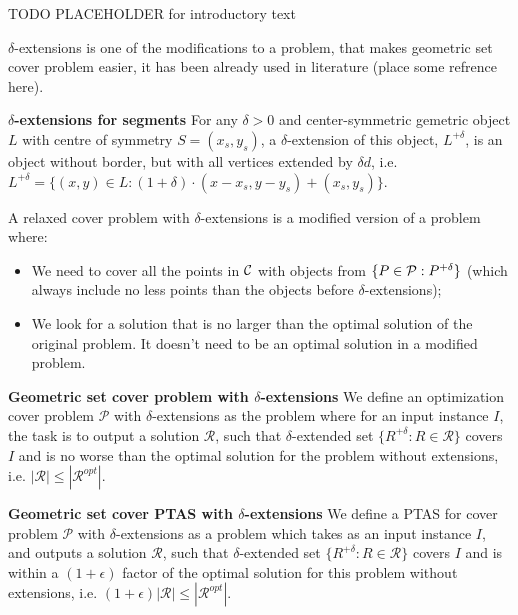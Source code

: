 TODO PLACEHOLDER for introductory text

$\delta$-extensions is one of the
modifications to a problem, that makes geometric set cover problem easier,
it has been already used in literature (place some refrence here).

\begin{defi}\textbf{$\delta$-extensions for segments}
For any $\delta > 0$ and center-symmetric gemetric object $L$ with
centre of symmetry $S = (x_s, y_s)$,
a $\delta$-extension of this object, $L^{+\delta}$,
is an object without border, but with all vertices extended by $\delta d$,
i.e. $ L^{+\delta} =
\{ (x, y) \in L : (1 + \delta)\cdot(x - x_s, y - y_s) + (x_s, y_s)\}$.
\end{defi}


A relaxed cover problem with $\delta$-extensions
is a modified version of a problem where:
\begin{itemize}
\item We need to cover all the points in $\mathcal{C}$
with objects from $\{P \in \mathcal{P} : P^{+\delta}\}$ (which always 
include no less points than the objects
before $\delta$-extensions);
\item We look for a solution that is no larger than the optimal solution
of the original problem. It doesn't need to be an optimal solution in
a modified problem.
\end{itemize}


\begin{defi}\textbf{Geometric set cover problem with $\delta$-extensions}
We define an optimization cover problem $\mathcal{P}$
with $\delta$-extensions as the problem where for an input instance $I$,
the task is to output a solution $\mathcal{R}$,
such that $\delta$-extended set
$\{ R^{+\delta} :  R \in \mathcal{R} \}$ covers $I$
and is no worse than the optimal solution for the problem without
extensions, i.e. $|\mathcal{R}| \le |\mathcal{R}^{opt}|$.
\end{defi}


\begin{defi}\textbf{Geometric set cover PTAS with $\delta$-extensions}
We define a PTAS for cover problem $\mathcal{P}$
with $\delta$-extensions as a problem which
takes as an input instance $I$,
and outputs a solution $\mathcal{R}$, such that $\delta$-extended set
$\{ R^{+\delta} :  R \in \mathcal{R} \}$ covers $I$
and is within a $(1+\epsilon)$ factor of the optimal
solution for this problem without
extensions, i.e. $(1+\epsilon)|\mathcal{R}| \le |\mathcal{R}^{opt}|$.

\end{defi}
